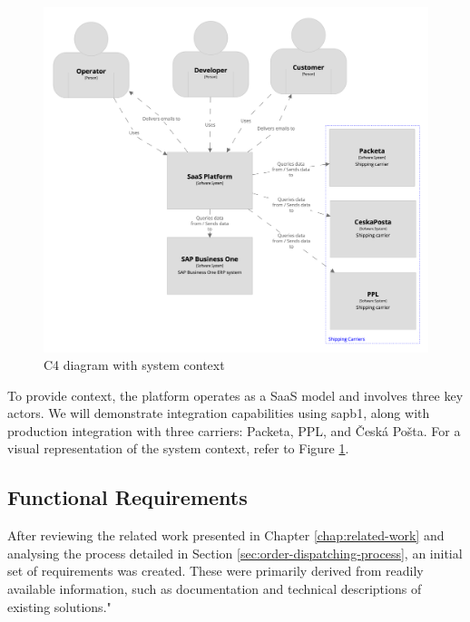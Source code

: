 \begin{figure}[H]\centering
\includegraphics[width=140mm]{img/chap02/fig_system_context.png}
\caption{C4 diagram with system context}
\label{img02:analysis.system-context}
\end{figure}

To provide context, the platform operates as a \ac{SaaS} model and involves three key actors. We will demonstrate integration capabilities using \gls{sapb1}, along with production integration with three carriers: Packeta, PPL, and Česká Pošta. For a visual representation of the system context, refer to Figure \ref{img02:analysis.system-context}.

\subsection{Functional Requirements}
\label{subsec:functional-requirements}

After reviewing the related work presented in Chapter \ref{chap:related-work} and analysing the process detailed in Section \ref{sec:order-dispatching-process}, an initial set of requirements was created.
These were primarily derived from readily available information, such as documentation and technical descriptions of existing solutions."

